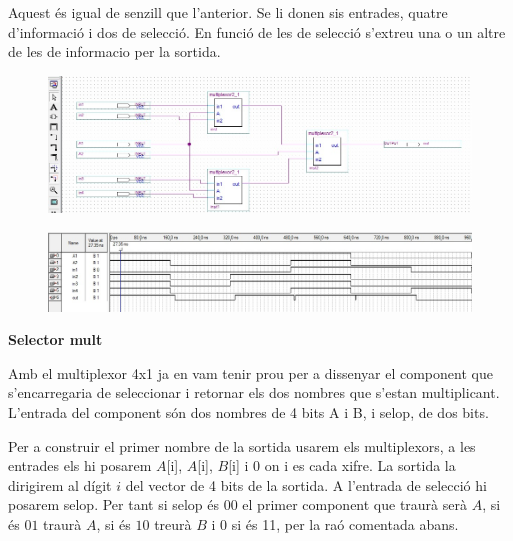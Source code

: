 \documentclass[12pt, a4papre]{article}
\begin{document}
	Aquest és igual de senzill que l'anterior. Se li donen sis entrades, quatre d'informació i dos de selecció. En funció de les de selecció s'extreu una o un altre de les de informacio per la sortida.
	
		
		\begin{center}
	\begin{figure}[H]
		\begin{center}
		\includegraphics[width=150mm]{multiplexor4_1.jpeg}
		\end{center}
	\end{figure}
	\end{center}
		
		\begin{center}
	\begin{figure}[H]
		\begin{center}
		\includegraphics[width=150mm]{plexor4_1.jpeg}
		\end{center}
	\end{figure}
		\end{center}
	
	\textbf{\large{Selector mult}}
	
	Amb el multiplexor 4x1 ja en vam tenir prou per a dissenyar el component que s'encarregaria de seleccionar i retornar els dos nombres que s'estan multiplicant. L'entrada del component són dos nombres de 4 bits A i B, i selop, de dos bits.

	Per a construir el primer nombre de la sortida usarem els multiplexors, a les entrades els hi posarem $A$[i], $A$[i], $B$[i] i 0 on i es cada xifre. La sortida la dirigirem al dígit $i$ del vector de 4 bits de la sortida. A l'entrada de selecció hi posarem selop. Per tant si selop és $00$ el primer component que traurà serà $A$, si és $01$ traurà $A$, si és $10$ treurà $B$ i 0 si és 11, per la raó comentada abans.
\end{document}
